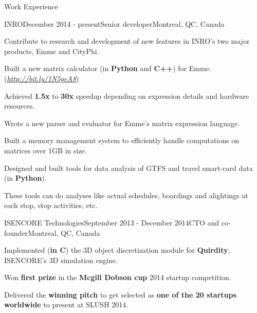\documentclass{resume} %
\begin{document}
\begin{rSection}{Work Experience}

\begin{rSubsection}{INRO}{December 2014 - present}{Senior developer}{Montreal,
  QC, Canada}
\item Contribute to research and development of new features in INRO's two
  major products, Emme and CityPhi.
\item Built a new matrix calculator (in \textbf{Python} and \textbf{C++}) for 
  Emme.(\href{http://bit.ly/1N5geA8}{\em{http://bit.ly/1N5geA8}})
\begin{lsubSubsection} 
\item Achieved \textbf{1.5x} to \textbf{30x} speedup depending on expression details and hardware
  resources.
\item Wrote a new parser and evaluator for Emme's matrix expression language.
\item Built a memory management system to efficiently handle computations on
  matrices over 1GB in size.
\end{lsubSubsection}
\item Designed and built tools for data analysis of GTFS and travel smart-card
  data (in \textbf{Python}). 
\begin{lsubSubsection} 
\item These tools can do analyses like actual schedules, boardings and
  alightings at each stop, stop activities, etc.
\end{lsubSubsection}
\end{rSubsection}

\begin{rSubsection}{ISENCORE Technologies}{September 2013 - December 2014}{CTO
  and co-founder}{Montreal, QC, Canada}
\item Implemented (\textbf{in C}) the 3D object discretization module for \textbf{Quirdity},
  ISENCORE's 3D simulation engine.
\item Won \textbf{first prize} in the \textbf{Mcgill Dobson cup} 2014 startup competition. 
\item Delivered the \textbf{winning pitch} to get selected as \textbf{one of the 20 startups
  worldwide} to present at SLUSH 2014.
\end{rSubsection}


\end{rSection}
\end{document}
